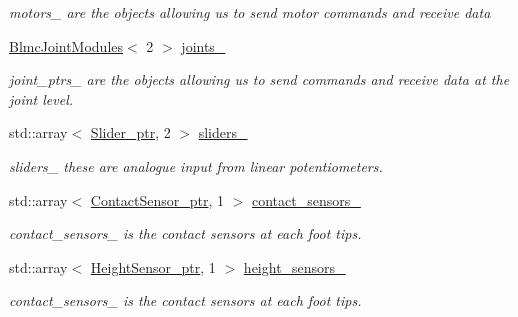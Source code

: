 \begin{DoxyCompactItemize}
\begin{DoxyCompactList}\small\item\em motors\+\_\+ are the objects allowing us to send motor commands and receive data \end{DoxyCompactList}\item 
\hyperlink{classblmc__robots_1_1BlmcJointModules}{Blmc\+Joint\+Modules}$<$ 2 $>$ \hyperlink{classblmc__robots_1_1Teststand_a2c14882d88deb56edde5240a8d841f2a}{joints\+\_\+}
\begin{DoxyCompactList}\small\item\em joint\+\_\+ptrs\+\_\+ are the objects allowing us to send commands and receive data at the joint level. \end{DoxyCompactList}\item 
std\+::array$<$ \hyperlink{common__header_8hpp_a4cb9a95e8b2c0bf237ce29f5252c7b73}{Slider\+\_\+ptr}, 2 $>$ \hyperlink{classblmc__robots_1_1Teststand_a2a67df9dc9004f9e70bcdd6ad8f8189e}{sliders\+\_\+}\hypertarget{classblmc__robots_1_1Teststand_a2a67df9dc9004f9e70bcdd6ad8f8189e}{}\label{classblmc__robots_1_1Teststand_a2a67df9dc9004f9e70bcdd6ad8f8189e}

\begin{DoxyCompactList}\small\item\em sliders\+\_\+ these are analogue input from linear potentiometers. \end{DoxyCompactList}\item 
std\+::array$<$ \hyperlink{common__header_8hpp_ac78fe5c68e56a3b884117109959e4d58}{Contact\+Sensor\+\_\+ptr}, 1 $>$ \hyperlink{classblmc__robots_1_1Teststand_af2f14b46da7f2dfbeeea59b47669f1e8}{contact\+\_\+sensors\+\_\+}
\begin{DoxyCompactList}\small\item\em contact\+\_\+sensors\+\_\+ is the contact sensors at each foot tips. \end{DoxyCompactList}\item 
std\+::array$<$ \hyperlink{common__header_8hpp_a921d3f5a8878524375bf7e740f2fb788}{Height\+Sensor\+\_\+ptr}, 1 $>$ \hyperlink{classblmc__robots_1_1Teststand_a41a93d1d128333a9981603eb82d068c0}{height\+\_\+sensors\+\_\+}
\begin{DoxyCompactList}\small\item\em contact\+\_\+sensors\+\_\+ is the contact sensors at each foot tips. \end{DoxyCompactList}\end{DoxyCompactItemize}
